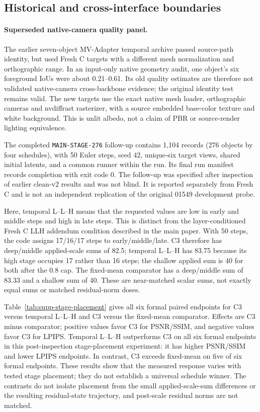 \documentclass[11pt]{article}
\begin{document}
\clearpage

\subsection*{Historical and cross-interface boundaries}
\paragraph{Superseded native-camera quality panel.}
The earlier seven-object MV-Adapter temporal archive passed source-path identity, but used Fresh C targets with a different mesh normalization and orthographic range. In an input-only native geometry audit, one object's six foreground IoUs were about 0.21--0.61. Its old quality estimates are therefore not validated native-camera cross-backbone evidence; the original identity test remains valid. The new targets use the exact native mesh loader, orthographic cameras and nvdiffrast rasterizer, with a source embedded base-color texture and white background. This is unlit albedo, not a claim of PBR or source-render lighting equivalence.

The completed \texttt{MAIN-STAGE-276} follow-up contains 1,104 records (276 objects by four schedules), with 50 Euler steps, seed 42, unique-six target views, shared initial latents, and a common runner within the run. Its final run manifest records completion with exit code 0. The follow-up was specified after inspection of earlier clean-v2 results and was not blind. It is reported separately from Fresh C and is not an independent replication of the original 01549 development probe.

Here, temporal L--L--H means that the requested values are low in early and middle steps and high in late steps. This is distinct from the layer-conditioned Fresh C LLH addendum condition described in the main paper. With 50 steps, the code assigns 17/16/17 steps to early/middle/late. C3 therefore has deep/middle applied-scale sums of 82.5; temporal L--L--H has 83.75 because its high stage occupies 17 rather than 16 steps; the shallow applied sum is 40 for both after the 0.8 cap. The fixed-mean comparator has a deep/middle sum of 83.33 and a shallow sum of 40. These are near-matched scalar sums, not exactly equal sums or matched residual-norm doses.

Table~\ref{tab:supp-stage-placement} gives all six formal paired endpoints for C3 versus temporal L--L--H and C3 versus the fixed-mean comparator. Effects are C3 minus comparator; positive values favor C3 for PSNR/SSIM, and negative values favor C3 for LPIPS. Temporal L--L--H outperforms C3 on all six formal endpoints in this post-inspection stage-placement experiment: it has higher PSNR/SSIM and lower LPIPS endpoints. In contrast, C3 exceeds fixed-mean on five of six formal endpoints. These results show that the measured response varies with tested stage placement; they do not establish a universal schedule winner. The contrasts do not isolate placement from the small applied-scale-sum differences or the resulting residual-state trajectory, and post-scale residual norms are not matched.
\end{document}
